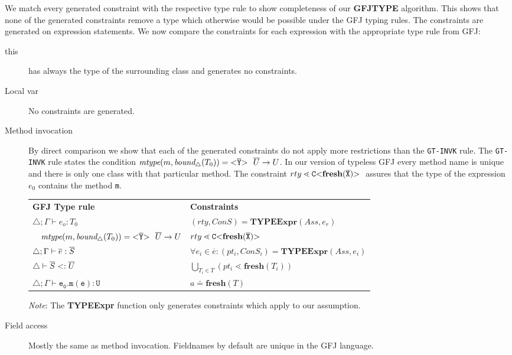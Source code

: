 \documentclass[acmsmall,screen,review]{acmart}
\begin{document}
We match every generated constraint with the respective type rule to show completeness of our \textbf{GFJTYPE} algorithm.
This shows that none of the generated constraints remove a type which otherwise would be possible under the GFJ typing rules.
The constraints are generated on expression statements.
We now compare the constraints for each expression with the appropriate type rule from GFJ:
\begin{description}
  \item [this]
  has always the type of the surrounding class and generates no constraints.
  \item [Local var]
  No constraints are generated.
  \item[Method invocation]
By direct comparison we show that each of the generated constraints do not apply more restrictions than the \texttt{GT-INVK} rule.
The \texttt{GT-INVK} rule states the condition $\textit{mtype}(m, \textit{bound}_\triangle(T_0)) = \mathtt{ {\tt <} \overline{Y} {\tt >} \ }\ \overline{U} \to U$.
In our version of typeless GFJ every method name is unique
and there is only one class with that particular method.
The constraint $rty \lessdot \mathtt{C {\tt <} \textbf{fresh}(\overline{X}) {\tt >} \ }$ assures that the type of the expression $e_0$ contains the method \texttt{m}.

\begin{tabular}{l|l}
  \textbf{GFJ Type rule} & \textbf{Constraints} \\
  $\triangle; \Gamma \vdash e_o : T_0$ & $(rty, ConS) = \textbf{TYPEExpr}(Ass, e_r)$\\ 
  $\quad \textit{mtype}(m, \textit{bound}_\triangle(T_0)) = \exptype{}{\ol{Y}}\ \ol{U} \to U$ & $rty \lessdot \mathtt{C {\tt <} \textbf{fresh}(\overline{X}) {\tt >} \ }$ \\
 $\triangle; \Gamma \vdash \overline{e} : \overline{S}$ & $\forall e_i \in \overline{e} : (pt_i, ConS_i) = \textbf{TYPEExpr}(Ass, e_i)$\\
 $\triangle \vdash \overline{S} <: \overline{U}$ & $ \bigcup_{T_i \in \overline{T}} (pt_i \lessdot \textbf{fresh}(T_i))$\\
 $\triangle; \Gamma \vdash \mathtt{e_0.m(\overline{e}) : U }$ & $a \doteq \textbf{fresh}(T)$ \\
\end{tabular}

\textit{Note}: The \textbf{TYPEExpr} function only generates constraints which apply to our assumption.
 \item[Field access]
Mostly the same as method invocation.
Fieldnames by default are unique in the GFJ language.


\end{description}
\end{document}
